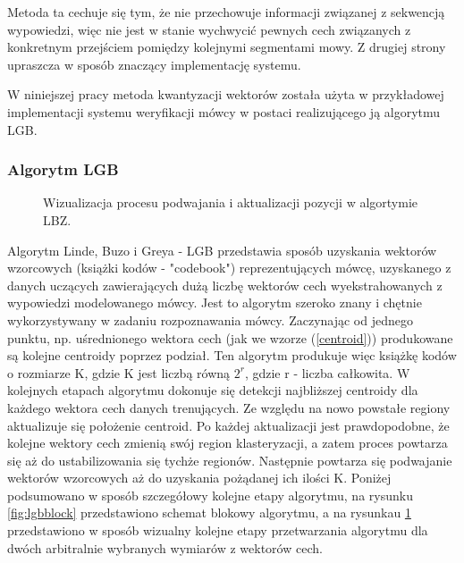 Metoda ta cechuje się tym, że nie przechowuje informacji związanej z sekwencją wypowiedzi, więc nie jest w stanie wychwycić pewnych cech związanych z konkretnym przejściem pomiędzy kolejnymi segmentami mowy. Z drugiej strony upraszcza w sposób znaczący implementację systemu.


W niniejszej pracy metoda kwantyzacji wektorów została użyta w przykładowej implementacji systemu weryfikacji mówcy w postaci realizującego ją algorytmu LGB.

\subsubsection{Algorytm LGB}
\label{lgb}

\begin{figure}
  \centering
    
    \caption{\label{fig:lgbvis} Wizualizacja procesu podwajania i aktualizacji pozycji w algortymie LBZ.}
\end{figure}

Algorytm Linde, Buzo i Greya - LGB \cite{linde} przedstawia sposób uzyskania wektorów wzorcowych (książki kodów - "codebook") reprezentujących mówcę, uzyskanego z danych uczących zawierających dużą liczbę wektorów cech wyekstrahowanych z wypowiedzi modelowanego mówcy. Jest to algorytm szeroko znany i chętnie wykorzystywany \cite{minidsp} w zadaniu rozpoznawania mówcy. Zaczynając od jednego punktu, np. uśrednionego wektora cech (jak we wzorze (\ref{centroid})) produkowane są kolejne centroidy
poprzez podział. Ten algorytm produkuje więc książkę kodów o rozmiarze K, gdzie K jest liczbą równą $2^r$, gdzie r - liczba całkowita. W kolejnych etapach algorytmu dokonuje się detekcji najbliższej centroidy dla każdego wektora cech danych trenujących. Ze względu na nowo powstałe regiony aktualizuje się położenie centroid. Po każdej aktualizacji jest prawdopodobne, że kolejne wektory cech zmienią swój region klasteryzacji, a zatem proces powtarza się aż do ustabilizowania się tychże regionów.
Następnie powtarza się podwajanie wektorów wzorcowych aż do uzyskania pożądanej ich ilości K. Poniżej podsumowano w sposób szczegółowy kolejne etapy algorytmu, na rysunku \ref{fig:lgbblock} przedstawiono schemat blokowy algorytmu, a na rysunkau \ref{fig:lgbvis} przedstawiono w sposób wizualny kolejne etapy przetwarzania algorytmu dla dwóch arbitralnie wybranych wymiarów z wektorów cech.
\\


